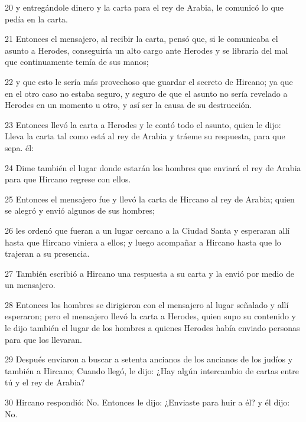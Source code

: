 \par 20 y entregándole dinero y la carta para el rey de Arabia, le comunicó lo que pedía en la carta.

\par 21 Entonces el mensajero, al recibir la carta, pensó que, si le comunicaba el asunto a Herodes, conseguiría un alto cargo ante Herodes y se libraría del mal que continuamente temía de sus manos;

\par 22 y que esto le sería más provechoso que guardar el secreto de Hircano; ya que en el otro caso no estaba seguro, y seguro de que el asunto no sería revelado a Herodes en un momento u otro, y así ser la causa de su destrucción.

\par 23 Entonces llevó la carta a Herodes y le contó todo el asunto, quien le dijo: Lleva la carta tal como está al rey de Arabia y tráeme su respuesta, para que sepa. él:

\par 24 Dime también el lugar donde estarán los hombres que enviará el rey de Arabia para que Hircano regrese con ellos.

\par 25 Entonces el mensajero fue y llevó la carta de Hircano al rey de Arabia; quien se alegró y envió algunos de sus hombres;

\par 26 les ordenó que fueran a un lugar cercano a la Ciudad Santa y esperaran allí hasta que Hircano viniera a ellos; y luego acompañar a Hircano hasta que lo trajeran a su presencia.

\par 27 También escribió a Hircano una respuesta a su carta y la envió por medio de un mensajero.

\par 28 Entonces los hombres se dirigieron con el mensajero al lugar señalado y allí esperaron; pero el mensajero llevó la carta a Herodes, quien supo su contenido y le dijo también el lugar de los hombres a quienes Herodes había enviado personas para que los llevaran.

\par 29 Después enviaron a buscar a setenta ancianos de los ancianos de los judíos y también a Hircano; Cuando llegó, le dijo: ¿Hay algún intercambio de cartas entre tú y el rey de Arabia?

\par 30 Hircano respondió: No. Entonces le dijo: ¿Enviaste para huir a él? y él dijo: No.

